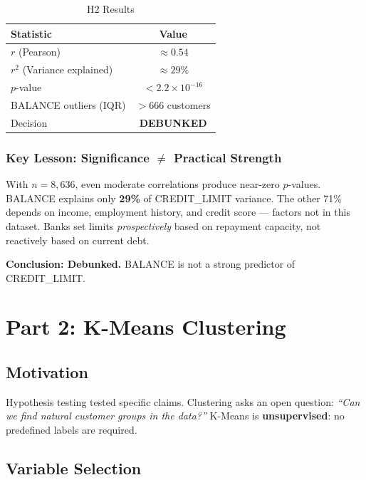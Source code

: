 \documentclass[12pt, letterpaper]{article}
\begin{document}
\begin{table}[H]
  \centering
  \caption{H2 Results}
  \begin{tabular}{lc}
    \toprule
    \textbf{Statistic} & \textbf{Value} \\
    \midrule
    $r$ (Pearson)              & $\approx 0.54$ \\
    $r^2$ (Variance explained) & $\approx 29\%$ \\
    $p$-value                  & $< 2.2\times10^{-16}$ \\
    BALANCE outliers (IQR)     & $>666$ customers \\
    Decision                   & \textbf{DEBUNKED} \\
    \bottomrule
  \end{tabular}
\end{table}

\subsubsection{Key Lesson: Significance $\neq$ Practical Strength}

With $n = 8{,}636$, even moderate correlations produce near-zero $p$-values.
BALANCE explains only \textbf{29\%} of CREDIT\_LIMIT variance. The other 71\%
depends on income, employment history, and credit score --- factors not in this
dataset. Banks set limits \textit{prospectively} based on repayment capacity,
not reactively based on current debt.

\textbf{Conclusion: Debunked.} BALANCE is not a strong predictor of CREDIT\_LIMIT.

\section{Part 2: K-Means Clustering}

\subsection{Motivation}

Hypothesis testing tested specific claims. Clustering asks an open question:
\textit{``Can we find natural customer groups in the data?''}
K-Means is \textbf{unsupervised}: no predefined labels are required.

\subsection{Variable Selection}
\end{document}
